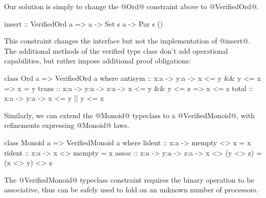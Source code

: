 %
Our solution is simply to change the @Ord@ constraint above to
@VerifiedOrd@.
\begin{mcode}
  insert :: VerifiedOrd a => a -> Set s a -> Par s ()
\end{mcode}
%
This constraint changes the interface but not the implementation of @insert@.
%
%
The additional methods of the verified type class don't add operational
capabilities, but rather impose additional proof obligations:

\begin{code}
  class Ord a => VerifiedOrd a where
   antisym :: x:a -> y:a -> { x <= y && y <= x => x = y }
   trans   :: x:a -> y:a -> z:a -> { x <= y && y <= z => x <= z }
   total   :: x:a -> y:a -> { x <= y || y <= x }
\end{code}


Similarly, we can extend
the @Monoid@ typeclass to a @VerifiedMonoid@, with refinements
expressing @Monoid@ laws.
%
\begin{code}
  class Monoid a => VerifiedMonoid a where
   lident :: x:a -> { mempty <> x = x }
   rident :: x:a -> { x <> mempty = x }
   assoc  :: x:a -> y:a -> z:a -> { x <> (y <> z) = (x <> y) <> z }
\end{code}
The @VerifiedMonoid@ typeclass constraint requires the binary operation
to be associative, thus can be safely used to fold on
an unknown number of processors.




